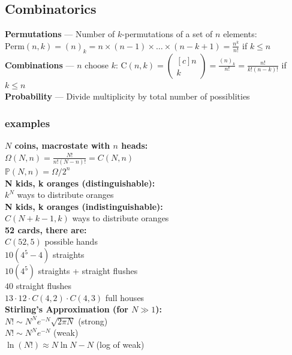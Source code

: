 \documentclass[letterpaper,landscape,10pt]{article}
\begin{document}
{\begin{multicols}{4}
	\subsection*{Combinatorics}
	\textbf{Permutations} --- Number of $k$-permutations of a set of $n$
	elements:
	$\textrm{Perm}(n,k)=(n)_k=n\times(n-1)\times\dots\times(n-k+1)=\frac{n^k}{n!}$
	if $k\le n$ \\
	\textbf{Combinations} --- $n$ choose $k$: $\textrm{C}(n,k)=\begin{pmatrix}[c]n\\k\end{pmatrix}=\frac{(n)_k}{n!}=\frac{n!}{k!(n-k)!}$ if $k\le n$ \\
	\textbf{Probability} --- Divide multiplicity by total number of possiblities \\
	\subsubsection*{examples}
  		  \textbf{$N$ coins, macrostate with $n$ heads:}\\
  		  \hspace{5pt}$\Omega(N,n)=\frac{N!}{n!(N-n)!}= C(N,n)$ \\
		  \hspace{5pt}$\mathbb{P}(N,n)=\Omega/2^n$ \\
  		  \textbf{N kids, k oranges (distinguishable):} \\
  		  \hspace{5pt} $k^N$ ways to distribute oranges \\
  		  \textbf{N kids, k oranges (indistinguishable):} \\
  		  \hspace{5pt} $C(N+k-1,k)$ ways to distribute oranges \\
  		  \textbf{52 cards, there are:} \\
  		  \hspace{5pt} $C(52,5)$ possible hands \\
  		  \hspace{5pt} $10(4^5-4)$ straights \\
  		  \hspace{5pt} $10(4^5)$ straights + straight flushes \\
  		  \hspace{5pt} $40$ straight flushes \\
  		  \hspace{5pt} $13\cdot12\cdot C(4,2)\cdot C(4,3)$ full houses \\
  		  \textbf{Stirling's Approximation (for $N \gg 1$):} \\
  		  \hspace{5pt} $N! \sim N^Ne^{-N}\sqrt{2\pi N}$ (strong) \\
  		  \hspace{5pt} $N! \sim N^Ne^{-N}$ (weak) \\
  		  \hspace{5pt} $\ln (N!) \approx N\ln N - N$ (log of weak) \\



\end{multicols}}
\end{document}
